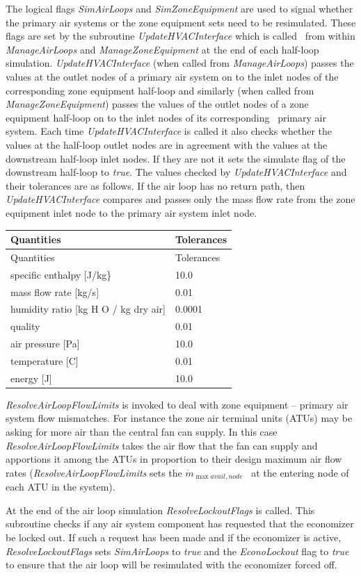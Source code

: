 The logical flags \emph{SimAirLoops} and \emph{SimZoneEquipment} are used to signal whether the primary air systems or the zone equipment sets need to be resimulated. These flags are set by the subroutine \emph{UpdateHVACInterface} which is called~ from within \emph{ManageAirLoops} and \emph{ManageZoneEquipment} at the end of each half-loop simulation. \emph{UpdateHVACInterface} (when called from \emph{ManageAirLoops}) passes the values at the outlet nodes of a primary air system on to the inlet nodes of the corresponding zone equipment half-loop and similarly (when called from \emph{ManageZoneEquipment}) passes the values of the outlet nodes of a zone equipment half-loop on to the inlet nodes of its corresponding~ primary air system. Each time \emph{UpdateHVACInterface} is called it also checks whether the values at the half-loop outlet nodes are in agreement with the values at the downstream half-loop inlet nodes. If they are not it sets the simulate flag of the downstream half-loop to \emph{true}. The values checked by \emph{UpdateHVACInterface} and their tolerances are as follows. If the air loop has no return path, then \emph{UpdateHVACInterface} compares and passes only the mass flow rate from the zone equipment inlet node to the primary air system inlet node.


\begin{longtable}[c]{@{}ll@{}}
\toprule
Quantities & Tolerances \tabularnewline
\midrule
\endfirsthead

\toprule
Quantities & Tolerances \tabularnewline
\midrule
\endhead

specific enthalpy [J/kg\} & 10.0 \tabularnewline
mass flow rate [kg/s] & 0.01 \tabularnewline
humidity ratio [kg H  O / kg dry air] & 0.0001 \tabularnewline
quality & 0.01 \tabularnewline
air pressure [Pa] & 10.0 \tabularnewline
temperature [C] & 0.01 \tabularnewline
energy [J] & 10.0 \tabularnewline
\bottomrule
\end{longtable}

\emph{ResolveAirLoopFlowLimits} is invoked to deal with zone equipment -- primary air system flow mismatches. For instance the zone air terminal units (ATUs) may be asking for more air than the central fan can supply. In this case \emph{ResolveAirLoopFlowLimits} takes the air flow that the fan can supply and apportions it among the ATUs in proportion to their design maximum air flow rates (\emph{ResolveAirLoopFlowLimits} sets the \({\dot m_{\max avail,node}}\) ~at the entering node of each ATU in the system).

At the end of the air loop simulation \emph{ResolveLockoutFlags} is called. This subroutine checks if any air system component has requested that the economizer be locked out. If such a request has been made and if the economizer is active, \emph{ResolveLockoutFlags} sets \emph{SimAirLoops} to \emph{true} and the \emph{EconoLockout} flag to \emph{true} to ensure that the air loop will be resimulated with the economizer forced off.
